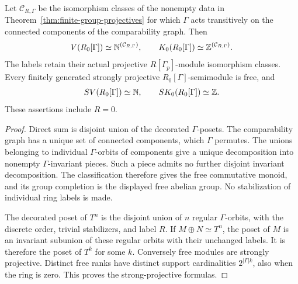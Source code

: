 \begin{corollary}\label{cor:finite-group-kzero}
Let $\mathcal C_{R,\Gamma}$ be the isomorphism classes of the nonempty
data in Theorem~\ref{thm:finite-group-projectives} for which $\Gamma$
acts transitively on the connected components of the comparability graph.
Then
\[
 V(R_0[\Gamma])\simeq\mathbb N^{(\mathcal C_{R,\Gamma})},\qquad
 K_0(R_0[\Gamma])\simeq\mathbb Z^{(\mathcal C_{R,\Gamma})}.
\]
The labels retain their actual projective $R[\Gamma_p]$-module
isomorphism classes. Every finitely generated strongly projective
$R_0[\Gamma]$-semimodule is free, and
\[
 SV(R_0[\Gamma])\simeq\mathbb N,\qquad SK_0(R_0[\Gamma])\simeq\mathbb Z.
\]
These assertions include $R=0$.
\end{corollary}
\begin{proof}
Direct sum is disjoint union of the decorated $\Gamma$-posets.
The comparability graph has a unique set of connected components,
which $\Gamma$ permutes. The unions belonging to individual
$\Gamma$-orbits of components give a unique decomposition into
nonempty $\Gamma$-invariant pieces. Such a piece admits no further
disjoint invariant decomposition. The classification therefore gives
the free commutative monoid, and its group completion is the displayed
free abelian group. No stabilization of individual ring labels is made.

The decorated poset of $T^n$ is the disjoint union of $n$ regular
$\Gamma$-orbits, with the discrete order, trivial stabilizers, and
label $R$. If $M\oplus N\simeq T^n$, the poset of $M$ is an invariant
subunion of these regular orbits with their unchanged labels. It is
therefore the poset of $T^k$ for some $k$. Conversely free modules
are strongly projective. Distinct free ranks have distinct support
cardinalities $2^{|\Gamma|k}$, also when the ring is zero. This proves
the strong-projective formulas.
\end{proof}
